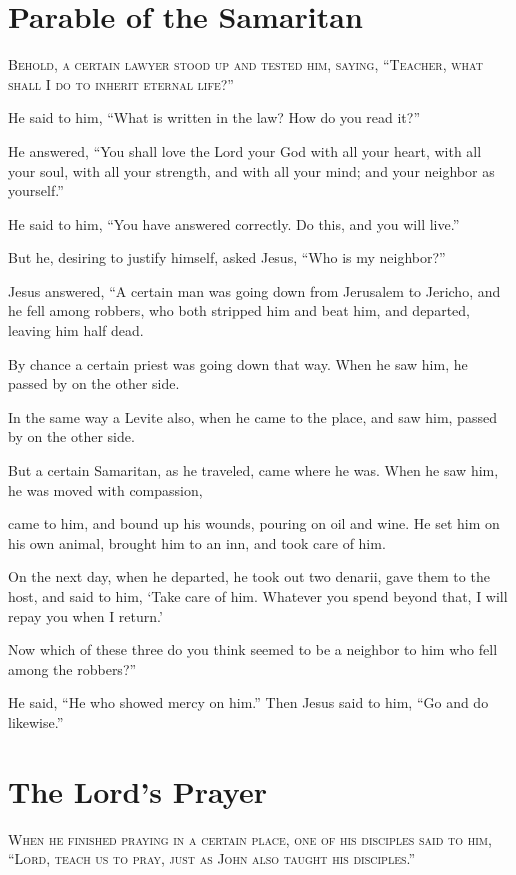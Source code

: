 \clearpage \section*{Parable of the Samaritan}

\lettrine{B}{ehold, a certain lawyer stood up and tested him, saying, “Teacher, what shall I do to inherit eternal life?”}

He said to him, “What is written in the law? How do you read it?”

He answered, “You shall love the Lord your God with all your heart, with all your soul, with all your strength, and with all your mind; and your neighbor as yourself.”

He said to him, “You have answered correctly. Do this, and you will live.”

But he, desiring to justify himself, asked Jesus, “Who is my neighbor?”

Jesus answered, “A certain man was going down from Jerusalem to Jericho, and he fell among robbers, who both stripped him and beat him, and departed, leaving him half dead.

By chance a certain priest was going down that way. When he saw him, he passed by on the other side.

In the same way a Levite also, when he came to the place, and saw him, passed by on the other side.

But a certain Samaritan, as he traveled, came where he was. When he saw him, he was moved with compassion,

came to him, and bound up his wounds, pouring on oil and wine. He set him on his own animal, brought him to an inn, and took care of him.

On the next day, when he departed, he took out two denarii, gave them to the host, and said to him, ‘Take care of him. Whatever you spend beyond that, I will repay you when I return.’

Now which of these three do you think seemed to be a neighbor to him who fell among the robbers?”

He said, “He who showed mercy on him.” Then Jesus said to him, “Go and do likewise.”


\clearpage \section*{The Lord's Prayer}

\lettrine{W}{hen he finished praying in a certain place, one of his disciples said to him, “Lord, teach us to pray, just as John also taught his disciples.”}

